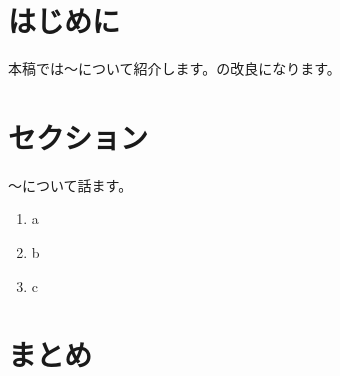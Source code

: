 \section{はじめに}
\label{sec:introduction}
本稿では〜について紹介します。\cite{GMR89}の改良になります。

\section{セクション}
〜について話ます。

\begin{enumerate}
  \item a
  \item b
  \item c
\end{enumerate}

\section{まとめ}
\label{sec:summary}
